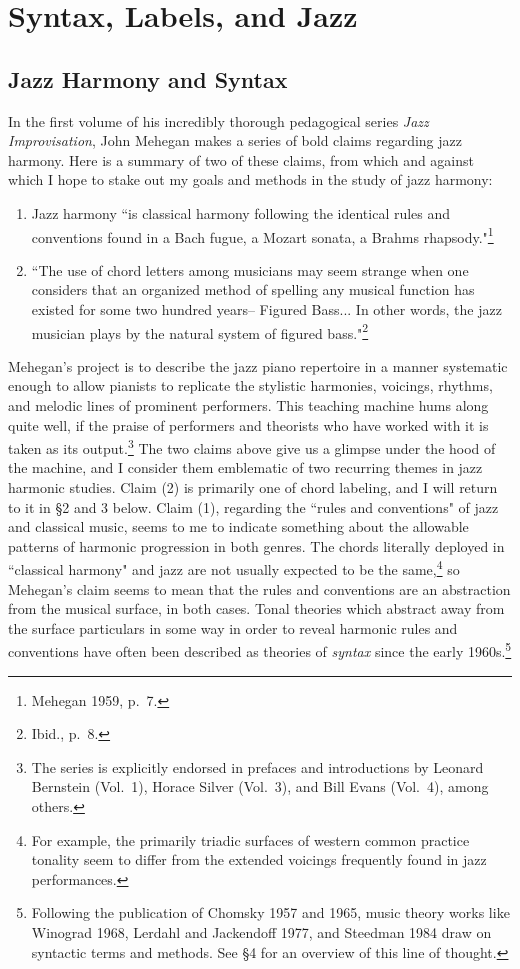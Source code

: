 \chapter{Syntax, Labels, and Jazz}

\section{Jazz Harmony and Syntax}
In the first volume of his incredibly thorough pedagogical series \emph{Jazz Improvisation}, John Mehegan makes a series of bold claims regarding jazz harmony.  Here is a summary of two of these claims, from which and against which I hope to stake out my goals and methods in the study of jazz harmony:
\begin{enumerate}
	\item Jazz harmony ``is classical harmony following the identical rules and conventions found in a Bach fugue, a Mozart sonata, a Brahms rhapsody."\footnote{Mehegan 1959, p.\ 7.}
	\item ``The use of chord letters among musicians may seem strange when one considers that an organized method of spelling any musical function has existed for some two hundred years-- Figured Bass... In other words, the jazz musician plays by the natural system of figured bass."\footnote{Ibid., p.\ 8.}
\end{enumerate}
Mehegan's project is to describe the jazz piano repertoire in a manner systematic enough to allow pianists to replicate the stylistic harmonies, voicings, rhythms, and melodic lines of prominent performers.  This teaching machine hums along quite well, if the praise of performers and theorists who have worked with it is taken as its output.\footnote{The series is explicitly endorsed in prefaces and introductions by Leonard Bernstein (Vol.\ 1), Horace Silver (Vol.\ 3), and Bill Evans (Vol.\ 4), among others.}  The two claims above give us a glimpse under the hood of the machine, and I consider them emblematic of two recurring themes in jazz harmonic studies.  Claim (2) is primarily one of chord labeling, and I will return to it in \S 2 and 3 below.  Claim (1), regarding the ``rules and conventions" of jazz and classical music, seems to me to indicate something about the allowable patterns of harmonic progression in both genres.  The chords literally deployed in ``classical harmony" and jazz are not usually expected to be the same,\footnote{For example, the primarily triadic surfaces of western common practice tonality seem to differ from the extended voicings frequently found in jazz performances.} so Mehegan's claim seems to mean that the rules and conventions are an abstraction from the musical surface, in both cases.  Tonal theories which abstract away from the surface particulars in some way in order to reveal harmonic rules and conventions have often been described as theories of \emph{syntax} since the early 1960s.\footnote{Following the publication of Chomsky 1957 and 1965, music theory works like Winograd 1968, Lerdahl and Jackendoff 1977, and Steedman 1984 draw on syntactic terms and methods.  See \S 4 for an overview of this line of thought.}


